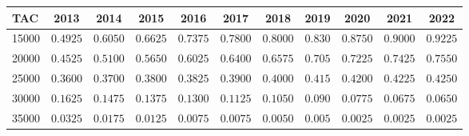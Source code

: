 \documentclass[shortnames,nojss,article]{jss}
\begin{document}
\begin{tabular}{lcccccccccc}
\hline
TAC  & 2013 & 2014 & 2015 & 2016 & 2017 & 2018 & 2019 & 2020 & 2021 & 2022 \\ 
\hline
15000  & $0.4925$ & $0.6050$ & $0.6625$ & $0.7375$ & $0.7800$ & $0.8000$ & $0.830$ & $0.8750$ & $0.9000$ & $0.9225$ \\
20000  & $0.4525$ & $0.5100$ & $0.5650$ & $0.6025$ & $0.6400$ & $0.6575$ & $0.705$ & $0.7225$ & $0.7425$ & $0.7550$ \\
25000  & $0.3600$ & $0.3700$ & $0.3800$ & $0.3825$ & $0.3900$ & $0.4000$ & $0.415$ & $0.4200$ & $0.4225$ & $0.4250$ \\
30000  & $0.1625$ & $0.1475$ & $0.1375$ & $0.1300$ & $0.1125$ & $0.1050$ & $0.090$ & $0.0775$ & $0.0675$ & $0.0650$ \\
35000  & $0.0325$ & $0.0175$ & $0.0125$ & $0.0075$ & $0.0075$ & $0.0050$ & $0.005$ & $0.0025$ & $0.0025$ & $0.0025$ \\
\hline 
\end{tabular}%
\end{document}

